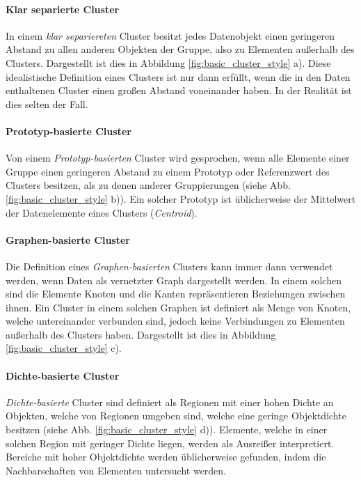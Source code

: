 \paragraph{Klar separierte Cluster}
In einem \textit{klar separiereten} Cluster besitzt jedes Datenobjekt einen geringeren Abstand zu allen anderen
Objekten der Gruppe, also zu Elementen außerhalb des Clusters.
Dargestellt ist dies in Abbildung \ref{fig:basic_cluster_style} a). Diese idealistische Definition eines
Clusters ist nur dann erfüllt, wenn die in den Daten enthaltenen Cluster einen großen Abstand voneinander haben.
In der Realität ist dies selten der Fall.

\paragraph{Prototyp-basierte Cluster}
Von einem \textit{Prototyp-basierten} Cluster wird gesprochen, wenn alle Elemente einer Gruppe einen
geringeren Abstand zu einem Prototyp oder Referenzwert des Clusters besitzen, als zu denen anderer Gruppierungen (siehe Abb. \ref{fig:basic_cluster_style} b)).
Ein solcher Prototyp ist üblicherweise der Mittelwert der Datenelemente eines Clusters (\textit{Centroid}).

\paragraph{Graphen-basierte Cluster}
Die Definition eines \textit{Graphen-basierten} Clusters kann immer dann verwendet werden, wenn Daten
als vernetzter Graph dargestellt werden. In einem solchen sind die Elemente Knoten und die Kanten
repräsentieren Beziehungen zwischen ihnen. Ein Cluster in einem solchen Graphen ist definiert als Menge von
Knoten, welche untereinander verbunden sind, jedoch keine Verbindungen zu Elementen außerhalb des Clusters haben.
Dargestellt ist dies in Abbildung \ref{fig:basic_cluster_style} c).

\paragraph{Dichte-basierte Cluster}
\textit{Dichte-basierte} Cluster sind definiert als Regionen mit einer hohen Dichte an Objekten, welche von
Regionen umgeben sind, welche eine geringe Objektdichte besitzen (siehe Abb. \ref{fig:basic_cluster_style} d)).
Elemente, welche in einer solchen Region mit geringer Dichte liegen, werden als Ausreißer interpretiert.
Bereiche mit hoher Objektdichte werden üblicherweise gefunden, indem die Nachbarschaften von Elementen untersucht werden.

